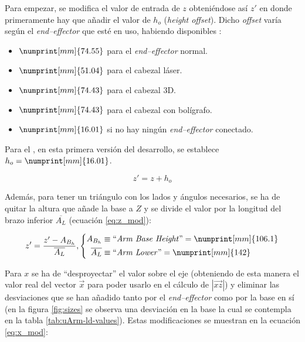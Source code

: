 Para empezar, se modifica el valor de entrada de $z$ obteniéndose así $z'$ en donde
primeramente hay que añadir el valor de $h_o$ (\textit{height offset}). Dicho \textit{offset}
varía según el \textit{end--effector} que esté en uso, habiendo disponibles \cite{UArmDeveloperSwiftProForArduino}:

\begin{itemize}
    \item $\numprint[mm]{74.55}$ para el \textit{end--effector} normal.
    \item $\numprint[mm]{51.04}$ para el cabezal láser.
    \item $\numprint[mm]{74.43}$ para el cabezal 3D.
    \item $\numprint[mm]{74.43}$ para el cabezal con bolígrafo.
    \item $\numprint[mm]{16.01}$ si no hay ningún \textit{end--effector} conectado.
\end{itemize}

Para el \pArm{}, en esta primera versión del desarrollo, se establece $h_o = \numprint[mm]{16.01}$.

\begin{equation}
    z' = z + h_o
\end{equation}

Además, para tener un triángulo con los lados y ángulos necesarios, se ha de quitar la
altura que añade la base a $Z$ y se divide el valor por la longitud del brazo inferior
$\overline{A_L}$ (ecuación \ref{eq:z_mod}):

\begin{equation}\label{eq:z_mod}
    z' = \frac{z' - A_{B_h}}{\overline{A_L}},
    \left\{\begin{aligned}
        A_{B_h}        & \equiv \text{``\textit{Arm Base Height}''} = \numprint[mm]{106.1} \\
        \overline{A_L} & \equiv \text{``\textit{Arm Lower}''} = \numprint[mm]{142}
    \end{aligned}\right.
\end{equation}

Para $x$ se ha de ``desproyectar'' el valor sobre el eje (obteniendo de esta manera el
valor real del vector $\overrightarrow{x}$ para poder usarlo en el cálculo de
$\left|\overrightarrow{xz}\right|$) y eliminar las desviaciones
que se han añadido tanto por el \textit{end--effector} como por la base en sí (en la
figura \ref{fig:sizes} se observa una desviación en la base la cual se contempla
en la tabla \ref{tab:uArm-ld-values}). Estas modificaciones se muestran en la ecuación
\ref{eq:x_mod}:

